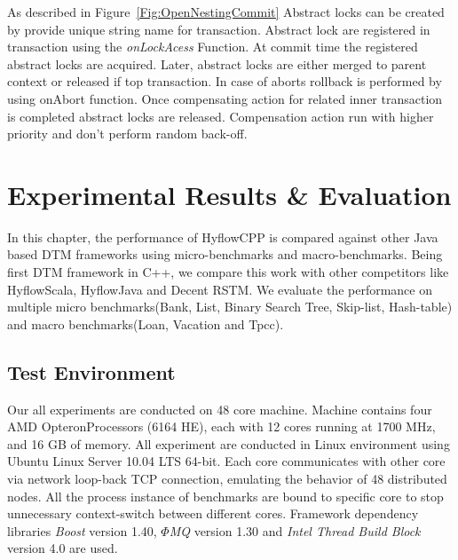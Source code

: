 \documentclass[12pt,english]{report}
\begin{document}
As described in Figure~\ref{Fig:OpenNestingCommit} Abstract locks can be created by provide unique string name for transaction. Abstract lock are registered in transaction using the \textit{onLockAcess} Function. At commit time the registered abstract locks are acquired. Later, abstract locks are either merged to parent context or released if top transaction. In case of aborts rollback is performed by using onAbort function. Once compensating action for related inner transaction is completed abstract locks are released. Compensation action run with higher priority and don't perform random back-off.   


\chapter{Experimental Results \& Evaluation}\label{chap:expResults}

In this chapter, the performance of HyflowCPP is compared against other Java based DTM frameworks using micro-benchmarks and macro-benchmarks. Being first DTM framework in C++, we compare this work with other competitors like HyflowScala, HyflowJava and Decent RSTM. We evaluate the performance on multiple micro benchmarks(Bank, List, Binary Search Tree, Skip-list, Hash-table) and  macro benchmarks(Loan, Vacation and Tpcc).   

\section{Test Environment}

Our all experiments are conducted on 48 core machine. Machine contains four AMD Opteron\texttrademark  Processors (6164 HE), each with 12 cores running at 1700 MHz, and 16 GB of memory. All experiment are conducted in Linux environment using Ubuntu Linux Server 10.04 LTS 64-bit.  Each core communicates with other core via network loop-back TCP connection, emulating the behavior of 48 distributed nodes. All the process instance of benchmarks are bound to specific core to stop unnecessary context-switch between different cores. Framework dependency libraries \textit{Boost} version 1.40, \textit{$\Phi$MQ} version 1.30 and \textit{Intel Thread Build Block} version 4.0 are used.  
\end{document}
